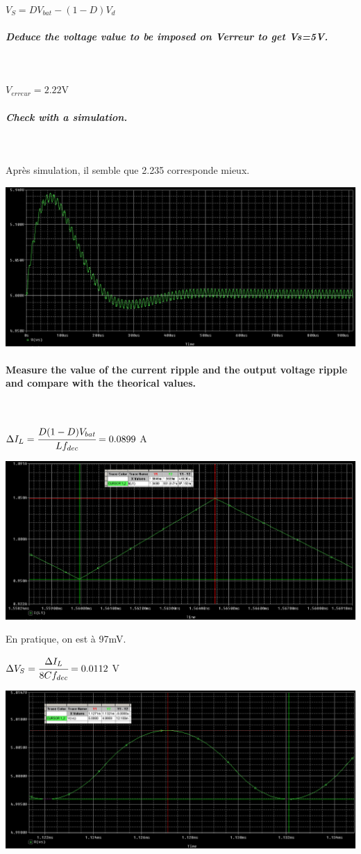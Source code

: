 \documentclass{article}
\begin{document}
~

$V_S = D V_{bat} - (1 - D)V_d$

\subparagraph{Deduce the voltage value to be imposed on Verreur to get Vs=5V.}

~

$V_{erreur}=2.22$V

\subparagraph{Check with a simulation.}

~

Après simulation, il semble que 2.235 corresponde mieux.

\includegraphics[width=\linewidth]{vs223.png}

\paragraph{Measure the value of the current ripple and the output voltage ripple and compare with the theorical values.}

~

$\Delta I_L = \cfrac{D(1-D)V_{bat}}{Lf_{dec}} = 0.0899$ A

\includegraphics[width=\linewidth]{ripple_il.png}

En pratique, on est à 97mV.

$\Delta V_S = \cfrac{\Delta I_L}{8Cf_{dec}} = 0.0112$ V

\includegraphics[width=\linewidth]{ripple_vs.png}
\end{document}
